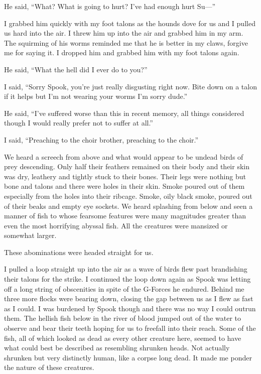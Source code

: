 He said, ``What? What is going to hurt? I've had enough hurt Su---''

I grabbed him quickly with my foot talons as the hounds dove for us and I pulled us hard into the air. I threw him up into the air and grabbed him in my arm. The squirming of his worms reminded me that he is better in my claws, forgive me for saying it. I dropped him and grabbed him with my foot talons again.

He said, ``What the hell did I ever do to you?''

I said, ``Sorry Spook, you're just really disgusting right now. Bite down on a talon if it helps but I'm not wearing your worms I'm sorry dude.''

He said, ``I've suffered worse than this in recent memory, all things considered though I would really prefer not to suffer at all.''

I said, ``Preaching to the choir brother, preaching to the choir.''

\parasep

We heard a screech from above and what would appear to be undead birds of prey descending. Only half their feathers remained on their body and their skin was dry, leathery and tightly stuck to their bones. Their legs were nothing but bone and talons and there were holes in their skin. Smoke poured out of them especially from the holes into their ribcage. Smoke, oily black smoke, poured out of their beaks and empty eye sockets. We heard splashing from below and seen a manner of fish to whose fearsome features were many magnitudes greater than even the most horrifying abyssal fish. All the creatures were mansized or somewhat larger.

These abominations were headed straight for us.

I pulled a loop straight up into the air as a wave of birds flew past brandishing their talons for the strike. I continued the loop down again as Spook was letting off a long string of obscenities in spite of the G-Forces he endured. Behind me three more flocks were bearing down, closing the gap between us as I flew as fast as I could. I was burdened by Spook though and there was no way I could outrun them. The hellish fish below in the river of blood jumped out of the water to observe and bear their teeth hoping for us to freefall into their reach. Some of the fish, all of which looked as dead as every other creature here, seemed to have what could best be described as resembling shrunken heads. Not actually shrunken but very distinctly human, like a corpse long dead. It made me ponder the nature of these creatures.

